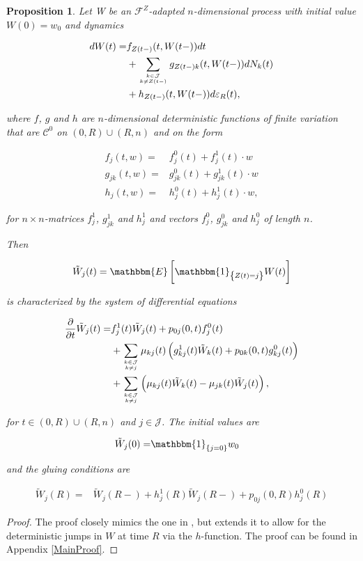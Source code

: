 \documentclass{book}
\newcommand{\1}[1]{\mathbbm{1}_{\left\lbrace #1 \right\rbrace}}
\newcommand{\expec}[1][def]{\mathbbm{E} \left[ #1 \right]}
\theoremstyle{break}
\newtheorem{proposition}[definition]{Proposition}%
\theoremstyle{remark}
\numberwithin{equation}{section}
\begin{document}
\begin{proposition} \label{MainResult}
	Let W be an $\mathcal{F}^{Z}$-adapted $n$-dimensional process with initial value $W(0)=w_0$ and dynamics
	
	\begin{align} \label{WDynamics}
\begin{split}
		dW(t) =& f_{Z(t-)}(t,W(t-)) dt \\
	&+ \sum_{k \in \mathcal{J} \atop k \neq Z(t-)} g_{Z(t-)k}(t,W(t-)) dN_{k}(t) \\
	&+ h_{Z(t-)}(t,W(t-)) d \varepsilon_R(t),
\end{split}
	\end{align}
	
	where $f$, $g$ and $h$ are $n$-dimensional deterministic functions of finite variation that are $\mathcal{C}^0$ on $(0,R) \cup (R,n)$ and on the form
	
	\begin{align*}
	f_j(t,w) =& f_j^0(t) + f_j^1(t) \cdot w \\
	g_{jk}(t,w) =& g_{jk}^0(t) + g_{jk}^1(t) \cdot w \\
	h_j(t,w) =& h_j^0(t) + h_j^1(t) \cdot w,
	\end{align*}
	
	for $n \times n$-matrices $f_j^1$, $g_{jk}^1$ and $ h_j^1$ and vectors $f_j^0$, $g_{jk}^0$ and $ h_j^0$ of length $n$.
	
	Then
	
	\begin{align*}
	\tilde{W}_j(t) = \expec[\1{Z(t)=j} W(t)]
	\end{align*}
	
	is characterized by the system of differential equations
	
	\begin{align*}
	\frac{\partial}{\partial t} \tilde{W}_j(t) =& f_j^1(t) \tilde{W}_j(t) + p_{0j}(0,t) f_j^0(t) \\
	&+ \sum_{k \in \mathcal{J} \atop k \neq j} \mu_{kj}(t) \left( g_{kj}^1(t) \tilde{W}_k(t) + p_{0k}(0,t) g_{kj}^0(t) \right) \\
	&+ \sum_{k \in \mathcal{J} \atop k \neq j} \left( \mu_{kj}(t) \tilde{W}_k(t) - \mu_{jk}(t) \tilde{W}_j(t) \right),
	\end{align*}
	
	for $t \in (0,R)\cup(R,n)$ and $j \in \mathcal{J}$. The initial values are
	
	\begin{align*}
	\tilde{W}_j(0) =& \1{j=0} w_0
	\end{align*}
	
	and the gluing conditions are
	
	\begin{align*}
	\tilde{W}_j(R) =& \tilde{W}_j(R-) + h_j^1(R) \tilde{W}_j(R-) + p_{0j}(0,R) h_j^0(R)
	\end{align*}
	
\end{proposition}
\begin{proof}
	The proof closely mimics the one in \cite{Lollike}, but extends it to allow for the deterministic jumps in $W$ at time $R$ via the $h$-function. The proof can be found in Appendix \ref{MainProof}.
\end{proof}
\end{document}
